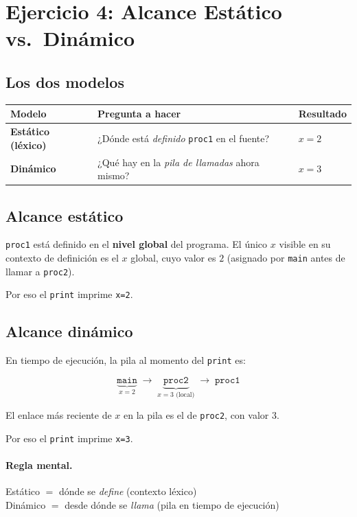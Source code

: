 \documentclass[11pt]{article}
\begin{document}
\section{Ejercicio 4: Alcance Estático vs.\ Dinámico}


\subsection*{Los dos modelos}

\begin{center}
\begin{tabular}{lll}
  \toprule
  Modelo & Pregunta a hacer & Resultado \\
  \midrule
  \textbf{Estático (léxico)} &
    ¿Dónde está \emph{definido} \texttt{proc1} en el fuente? &
    $x = 2$ \\
  \textbf{Dinámico} &
    ¿Qué hay en la \emph{pila de llamadas} ahora mismo? &
    $x = 3$ \\
  \bottomrule
\end{tabular}
\end{center}

\subsection*{Alcance estático}

\texttt{proc1} está definido en el \textbf{nivel global} del programa.
El único $x$ visible en su contexto de definición es el $x$ global,
cuyo valor es $2$ (asignado por \texttt{main} antes de llamar a
\texttt{proc2}).

Por eso el \texttt{print} imprime \texttt{x=2}.

\subsection*{Alcance dinámico}

En tiempo de ejecución, la pila al momento del \texttt{print} es:

\[
  \underbrace{\texttt{main}}_{\displaystyle x=2}
  \;\longrightarrow\;
  \underbrace{\texttt{proc2}}_{\displaystyle x=3 \text{ (local)}}
  \;\longrightarrow\;
  \texttt{proc1}
\]

El enlace más reciente de $x$ en la pila es el de \texttt{proc2},
con valor $3$.

Por eso el \texttt{print} imprime \texttt{x=3}.

\paragraph{Regla mental.}
  Estático $=$ dónde se \emph{define} (contexto léxico)\\
  Dinámico $=$ desde dónde se \emph{llama} (pila en tiempo de ejecución)
\end{document}

